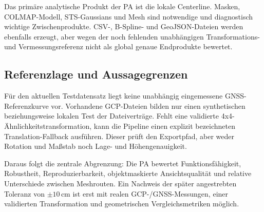 Das primäre analytische Produkt der PA ist die lokale Centerline. Masken,
COLMAP-Modell, STS-Gaussians und Mesh sind notwendige und diagnostisch wichtige
Zwischenprodukte. CSV-, B-Spline- und GeoJSON-Dateien werden ebenfalls erzeugt,
aber wegen der noch fehlenden unabhängigen Transformations- und
Vermessungsreferenz nicht als global genaue Endprodukte bewertet.

\subsection{Referenzlage und Aussagegrenzen}

Für den aktuellen Testdatensatz liegt keine unabhängig eingemessene
GNSS-Referenzkurve vor. Vorhandene GCP-Dateien bilden nur einen synthetischen
beziehungsweise lokalen Test der Dateiverträge. Fehlt eine validierte
4x4-Ähnlichkeitstransformation, kann die Pipeline einen explizit bezeichneten
Translation-Fallback ausführen. Dieser prüft den Exportpfad, aber weder Rotation
und Maßstab noch Lage- und Höhengenauigkeit.

Daraus folgt die zentrale Abgrenzung: Die PA bewertet Funktionsfähigkeit,
Robustheit, Reproduzierbarkeit, objektmaskierte Ansichtsqualität und relative
Unterschiede zwischen Meshrouten. Ein Nachweis der später angestrebten
Toleranz von $\pm10\,\mathrm{cm}$ ist erst mit realen GCP-/GNSS-Messungen,
einer validierten Transformation und geometrischen Vergleichsmetriken möglich.
